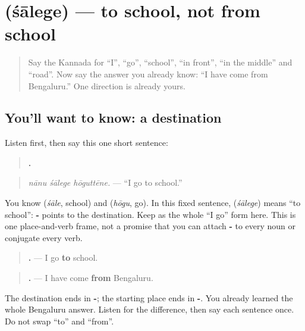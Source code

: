 \section[\texorpdfstring{\kn{ನಾನು} \kn{ಶಾಲೆಗೆ} … (nānu śālege …)}{ನಾನು ಶಾಲೆಗೆ … (nānu śālege …)}]{ (śālege) — to school, not from school}

\label{lesson:KA-C108-movement}



\begin{quote}
Say the Kannada for “I”, “go”, “school”, “in front”, “in the middle” and “road”. Now say the answer you already know: “I have come from Bengaluru.” One direction is already yours.
\end{quote}

\subsection*{You'll want to know: a destination}
Listen first, then say this one short sentence:

\begin{quote}
\textbf{  .}
\end{quote}

\begin{quote}
\emph{nānu śālege hōguttēne.} — “I go to school.”
\end{quote}

You know \textbf{} (\emph{śāle}, school) and \textbf{} (\emph{hōgu}, go). In this fixed sentence, \textbf{} (\emph{śālege}) means “to school”: \textbf{-} points to the destination. Keep \textbf{} as the whole “I go” form here. This is one place-and-verb frame, not a promise that you can attach \textbf{-} to every noun or conjugate every verb.

\begin{grammarlens}[title={Grammar lens: to and from}]
\begin{quote}
\textbf{  .} — I go \textbf{to} school.
\end{quote}

\begin{quote}
\textbf{  .} — I have come \textbf{from} Bengaluru.
\end{quote}

The destination ends in \textbf{-}; the starting place ends in \textbf{-}. You already learned the whole Bengaluru answer. Listen for the difference, then say each sentence once. Do not swap “to” and “from”.
\end{grammarlens}

